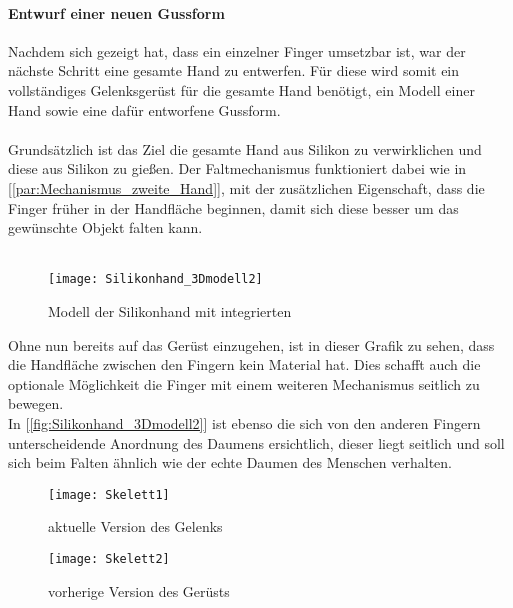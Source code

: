 \documentclass[titlepage,12pt,twoside]{article}
\begin{document}
\paragraph{Entwurf einer neuen Gussform}
\hfill \break
\hfill \break
Nachdem sich gezeigt hat, dass ein einzelner Finger umsetzbar ist, war der nächste Schritt eine gesamte Hand zu entwerfen. Für diese wird somit ein vollständiges Gelenksgerüst für die gesamte Hand benötigt, ein Modell einer Hand sowie eine dafür entworfene 
Gussform. \\
\\
Grundsätzlich ist das Ziel die gesamte Hand aus Silikon zu verwirklichen und diese aus Silikon zu gießen. Der Faltmechanismus funktioniert dabei wie in [\textcolor{blue}{\autoref{par:Mechanismus_zweite_Hand}}], mit der zusätzlichen Eigenschaft, dass die Finger früher 
in der Handfläche beginnen, damit sich diese besser um das gewünschte Objekt falten kann. \\
\\
\begin{figure}[H]
	\begin{center}
		\scalebox{0.8}
		{\texttt{[image: Silikonhand\_3Dmodell2]}}
		\caption{Modell der Silikonhand mit integrierten }
		\label{fig:Silikonhand_3Dmodell2}			
	\end{center}
\end{figure}
\hfill \break
Ohne nun bereits auf das Gerüst einzugehen, ist in dieser Grafik zu sehen, dass die Handfläche zwischen den Fingern kein Material hat. Dies schafft auch die optionale Möglichkeit die Finger mit einem weiteren Mechanismus seitlich zu bewegen. \\
In [\textcolor{blue}{\autoref{fig:Silikonhand_3Dmodell2}}] ist ebenso die sich von den anderen Fingern unterscheidende Anordnung des Daumens ersichtlich, dieser liegt seitlich und soll sich beim Falten ähnlich wie der echte Daumen des Menschen verhalten. \\
\begin{figure}[H]
	\begin{center}
		\scalebox{0.8}
		{\texttt{[image: Skelett1]}}
		\caption{aktuelle Version des Gelenks}
		\label{fig:Skelett1}			
	\end{center}
\end{figure}
\begin{figure}[H]
	\begin{center}
		\scalebox{0.8}
		{\texttt{[image: Skelett2]}}
		\caption{vorherige Version des Gerüsts}
		\label{fig:Skelett2}			
	\end{center}
\end{figure}
\end{document}
